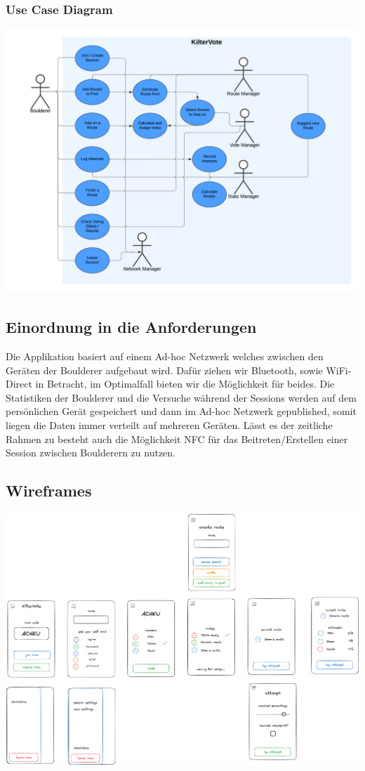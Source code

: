 \documentclass[11pt,a4paper,headsepline,footsepline,bibliography=totocnumbered]{article}
\begin{document}
    \subsubsection{Use Case Diagram}
      \includegraphics[width=\textwidth]{pictures/Use_Case_Diagram.png}

  \subsection{Einordnung in die Anforderungen}  
    \par  
      Die Applikation basiert auf einem Ad-hoc Netzwerk welches zwischen den Geräten der Boulderer aufgebaut wird.
      Dafür ziehen wir Bluetooth, sowie WiFi-Direct in Betracht, im Optimalfall bieten wir die Möglichkeit für beides.
      Die Statistiken der Boulderer und die Versuche während der Sessions werden auf dem persönlichen Gerät gespeichert und dann im Ad-hoc Netzwerk gepublished, somit liegen die Daten immer verteilt auf mehreren Geräten.
      Lässt es der zeitliche Rahmen zu besteht auch die Möglichkeit NFC für das Beitreten/Erstellen einer Session zwischen Boulderern zu nutzen.
    
  \subsection{Wireframes}
    \includegraphics[width=\textwidth]{pictures/KilterVote_GUI.png}
\end{document}
